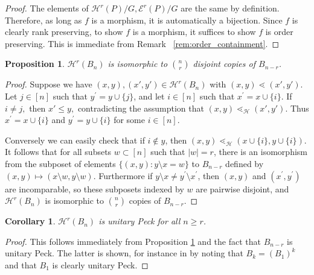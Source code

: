 \documentclass[10 pt]{amsart}
\theoremstyle{plain}
\newtheorem{prop}[thm]{Proposition}
\newtheorem{cor}[thm]{Corollary}
\theoremstyle{definition}
\theoremstyle{remark}
\numberwithin{equation}{section}
\begin{document}
\begin{proof}
The elements of $\mathcal H^r(P)/G,\mathcal E^r(P)/G$ are the same by definition. Therefore, as long as $f$ is a morphism, it is automatically a bijection. Since $f$ is clearly rank preserving, to show $f$ is a morphism, it suffices to show $f$ is order preserving. This is immediate from Remark ~\ref{rem:order_containment}.
\end{proof}



\begin{prop}\label{prop:computing_HBn}
$\mathcal{H}^r(B_n)$ is isomorphic to $\binom{n}{r}$ disjoint copies of $B_{n-r}$.
\end{prop}

\begin{proof}

Suppose we have $(x, y),(x', y') \in \mathcal H^r(B_n)$ with $(x, y) \lessdot (x', y').$ Let $j\in [n]$ such that $y^\prime = y\cup\{j\}$, and let $i\in [n]$ such that $x^\prime = x\cup \{i\}$. If $i \ne j,$ then $x' \leq y,$ contradicting the assumption that $(x, y) \lessdot_{\mathcal H} (x', y').$ Thus $x^\prime = x\cup\{i\}$ and $y^\prime = y\cup\{i\}$ for some $i\in [n]$.

Conversely we can easily check that if $i\not\in y$, then $(x, y)\lessdot_{\mathcal{H}} (x\cup\{i\}, y\cup\{i\})$.  It follows that for all subsets $w\subset [n]$ such that $|w| = r$, there is an isomorphism from the subposet of elements $\{(x, y)\colon y\setminus x = w\}$ to $B_{n-r}$ defined by $(x,y)\mapsto (x\setminus w,y\setminus w)$.  Furthermore if $y\setminus x \ne y^\prime \setminus x^\prime$, then $(x, y)$ and $(x^\prime, y^\prime)$ are incomparable, so these subposets indexed by $w$ are pairwise disjoint, and $\mathcal{H}^r(B_n)$ is isomorphic to $\binom{n}{r}$ copies of $B_{n-r}$.
\end{proof}

\begin{cor}\label{cor:HBn_unitary_peck}
$\mathcal{H}^r(B_n)$ is unitary Peck for all $n\ge r$.
\end{cor}

\begin{proof}
This follows immediately from Proposition \ref{prop:computing_HBn} and the fact that $B_{n-r}$ is unitary Peck.  The latter is shown, for instance in \cite[Theorem 2a]{quotients_stanley} by noting that $B_k = (B_1)^k$ and that $B_1$ is clearly unitary Peck.
\end{proof}
\end{document}
